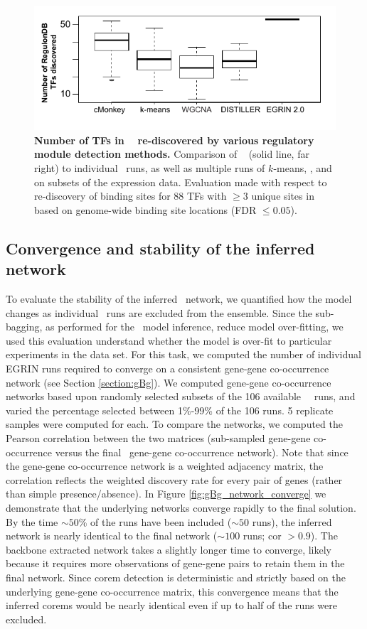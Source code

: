 \begin{figure}[h!]
\centering
\includegraphics[width=0.6\linewidth]{figures/ensemble_comparison_regDB.pdf}
\caption[Number of TFs in \rdb~ re-discovered by various
    regulatory module detection methods.]  {{\bf Number of TFs in
    \rdb~ re-discovered by various regulatory module detection
    methods.} Comparison of \egrine~ (solid line, far right) to
  individual \cm\ runs, as well as multiple runs of $k$-means,
  , and  on subsets of the expression
  data. Evaluation made with respect to re-discovery of binding sites
  for 88 TFs with $\geq 3$ unique sites in \rdb~ based on genome-wide
  binding site locations (FDR $\leq 0.05$).}
\label{fig:ensemble_comparison_regDB}
\end{figure}

\subsection{Convergence and stability of the inferred network}

To evaluate the stability of the inferred \egrine\ network, we
quantified how the model changes as individual \cm\ runs are excluded
from the ensemble. Since the sub-bagging, as performed for
the \egrine\ model inference, %
reduce model over-fitting, we used this evaluation understand whether
the model is over-fit to particular experiments in the data set. For
this task, we computed the number of individual EGRIN runs required to
converge on a consistent gene-gene co-occurrence network (see Section
\ref{section:gBg}). We computed gene-gene co-occurrence networks based upon randomly selected subsets of the 106 available \eco\ \cm\ runs, and varied the percentage selected between
1\%-99\% of the 106 runs. 5 replicate samples were computed for
each. To compare the networks, we computed the Pearson correlation
between the two matrices (sub-sampled gene-gene co-occurrence versus
the final \egrine\ gene-gene co-occurrence network). Note that since
the gene-gene co-occurrence network is a weighted adjacency matrix,
the correlation reflects the weighted discovery rate for every pair of
genes (rather than simple presence/absence). In
Figure \ref{fig:gBg_network_converge} we demonstrate that the
underlying networks converge rapidly to the final solution. By the
time $\sim 50$\% of the runs have been included ($\sim 50$ runs), the
inferred network is nearly identical to the final network ($\sim 100$
runs; cor $> 0.9$). The backbone extracted network takes a slightly
longer time to converge, likely because it requires more observations
of gene-gene pairs to retain them in the final network. Since corem
detection is deterministic and strictly based on the underlying
gene-gene co-occurrence matrix, this convergence means that the
inferred corems would be nearly identical even if up to half of the
runs were excluded.

